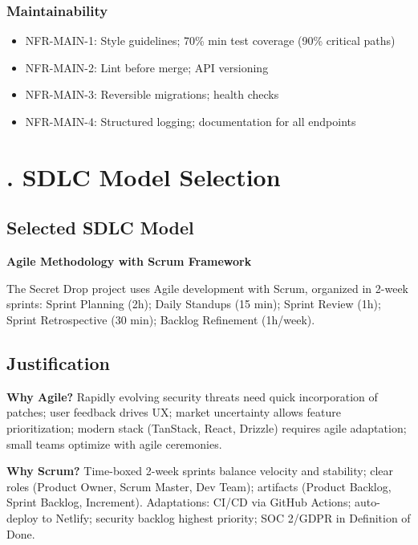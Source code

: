 \documentclass[12pt,a4paper]{article}
\begin{document}
\subsubsection*{Maintainability}
\begin{itemize}[leftmargin=*, itemsep=0.1em]
  \item NFR-MAIN-1: Style guidelines; 70\% min test coverage (90\% critical paths)
  \item NFR-MAIN-2: Lint before merge; API versioning
  \item NFR-MAIN-3: Reversible migrations; health checks
  \item NFR-MAIN-4: Structured logging; documentation for all endpoints
\end{itemize}

\section*{\fontsize{16pt}{1.2}. SDLC Model Selection}

\subsection*{\fontsize{14pt}{1.2} Selected SDLC Model}

\textbf{Agile Methodology with Scrum Framework}

The Secret Drop project uses Agile development with Scrum, organized in 2-week sprints: Sprint Planning (2h); Daily Standups (15 min); Sprint Review (1h); Sprint Retrospective (30 min); Backlog Refinement (1h/week).

\subsection*{\fontsize{14pt}{1.2} Justification}

\textbf{Why Agile?} Rapidly evolving security threats need quick incorporation of patches; user feedback drives UX; market uncertainty allows feature prioritization; modern stack (TanStack, React, Drizzle) requires agile adaptation; small teams optimize with agile ceremonies.

\textbf{Why Scrum?} Time-boxed 2-week sprints balance velocity and stability; clear roles (Product Owner, Scrum Master, Dev Team); artifacts (Product Backlog, Sprint Backlog, Increment). Adaptations: CI/CD via GitHub Actions; auto-deploy to Netlify; security backlog highest priority; SOC 2/GDPR in Definition of Done.
\end{document}
